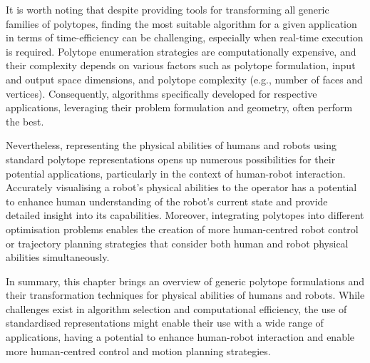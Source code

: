 It is worth noting that despite providing tools for transforming all generic families of polytopes, finding the most suitable algorithm for a given application in terms of time-efficiency can be challenging, especially when real-time execution is required. Polytope enumeration strategies are computationally expensive, and their complexity depends on various factors such as polytope formulation, input and output space dimensions, and polytope complexity (e.g., number of faces and vertices). Consequently, algorithms specifically developed for respective applications, leveraging their problem formulation and geometry, often perform the best.

Nevertheless, representing the physical abilities of humans and robots using standard polytope representations opens up numerous possibilities for their potential applications, particularly in the context of human-robot interaction. Accurately visualising a robot's physical abilities to the operator has a potential to enhance human understanding of the robot's current state and provide detailed insight into its capabilities. Moreover, integrating polytopes into different optimisation problems enables the creation of more human-centred robot control or trajectory planning strategies that consider both human and robot physical abilities simultaneously.

In summary, this chapter brings an overview of generic polytope formulations and their transformation techniques for physical abilities of humans and robots. While challenges exist in algorithm selection and computational efficiency, the use of standardised representations might enable their use with a wide range of applications, having a potential to enhance human-robot interaction and enable more human-centred control and motion planning strategies.
